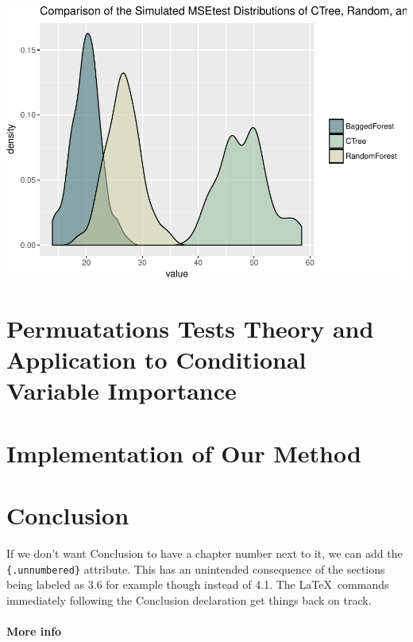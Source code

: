 \documentclass[12pt,twoside]{reedthesis}
\begin{document}
  \begin{center}\includegraphics{Thesis_files/figure-latex/fig13-1} \end{center}
  
  \chapter{Permuatations Tests Theory and Application to Conditional
  Variable
  Importance}\label{permuatations-tests-theory-and-application-to-conditional-variable-importance}
  
  \chapter{Implementation of Our
  Method}\label{implementation-of-our-method}
  
  \chapter*{Conclusion}\label{conclusion}
  
  \setcounter{chapter}{4} \setcounter{section}{0}
  
  If we don't want Conclusion to have a chapter number next to it, we can
  add the \texttt{\{.unnumbered\}} attribute. This has an unintended
  consequence of the sections being labeled as 3.6 for example though
  instead of 4.1. The \LaTeX~commands immediately following the Conclusion
  declaration get things back on track.
  
  \subsubsection{More info}\label{more-info}
  
\end{document}

